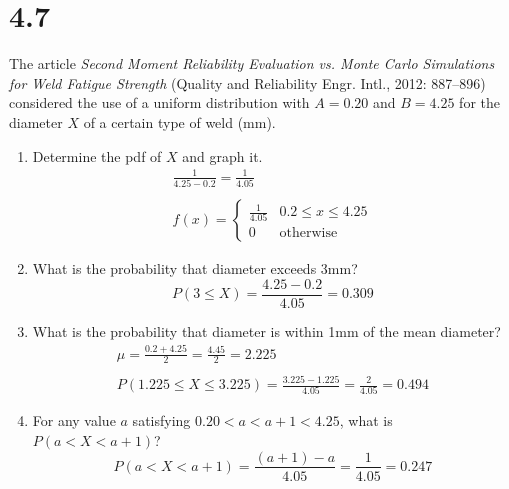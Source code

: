 \documentclass[letterpaper,12pt,fleqn]{article}
\begin{document}
\section*{4.7}

The article \emph{Second Moment Reliability Evaluation vs. Monte Carlo Simulations for Weld Fatigue Strength} (Quality and
Reliability Engr. Intl., 2012: 887--896) considered the use of a uniform distribution with \(A=0.20\) and \(B=4.25\) for the
diameter \(X\) of a certain type of weld (mm).
\begin{enumerate}[label={\alph*)}]
\item Determine the pdf of \(X\) and graph it.
  \begin{gather*}
    \frac{1}{4.25-0.2}=\frac{1}{4.05} \\
    \\
    f(x)=\begin{cases}
    \frac{1}{4.05} & 0.2\le x\le4.25 \\
    0 & \text{otherwise}
    \end{cases}
  \end{gather*}

\item What is the probability that diameter exceeds 3mm?
  \[P(3\le X)=\frac{4.25-0.2}{4.05}=0.309\]
\item What is the probability that diameter is within 1mm of the mean diameter?
  \begin{gather*}
    \mu=\frac{0.2+4.25}{2}=\frac{4.45}{2}=2.225 \\
    \\
    P(1.225\le X\le3.225)=\frac{3.225-1.225}{4.05}=\frac{2}{4.05}=0.494
  \end{gather*}
\item For any value \(a\) satisfying \(0.20<a<a+1<4.25\), what is \(P(a<X<a+1)\)?
  \[P(a<X<a+1)=\frac{(a+1)-a}{4.05}=\frac{1}{4.05}=0.247\]
\end{enumerate}
\end{document}

